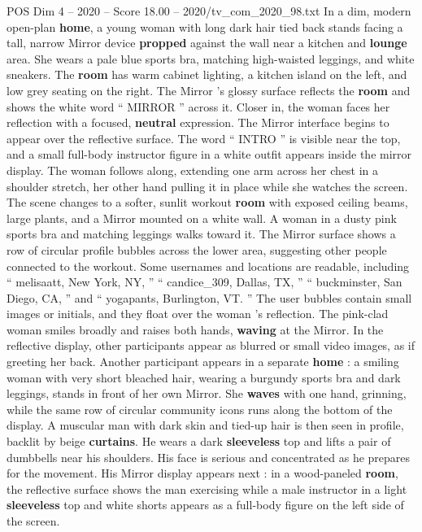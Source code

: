 \begin{textsample}{POS Dim 4 – 2020 – Score 18.00 – 2020/tv\_com\_2020\_98.txt}  \label{ex:f4_pos_008}
In a dim, modern open-plan \textbf{home}, a young woman with long dark hair tied back stands facing a tall, narrow Mirror device \textbf{propped} against the wall near a kitchen and \textbf{lounge} area.
She wears a pale blue sports bra, matching high-waisted leggings, and white sneakers.
The \textbf{room} has warm cabinet lighting, a kitchen island on the left, and low grey seating on the right.
The Mirror ’s glossy surface reflects the \textbf{room} and shows the white word “ MIRROR ” across it.
Closer in, the woman faces her reflection with a focused, \textbf{neutral} expression.
The Mirror interface begins to appear over the reflective surface.
The word “ INTRO ” is visible near the top, and a small full-body instructor figure in a white outfit appears inside the mirror display.
The woman follows along, extending one arm across her chest in a shoulder stretch, her other hand pulling it in place while she watches the screen.
The scene changes to a softer, sunlit workout \textbf{room} with exposed ceiling beams, large plants, and a Mirror mounted on a white wall.
A woman in a dusty pink sports bra and matching leggings walks toward it.
The Mirror surface shows a row of circular profile bubbles across the lower area, suggesting other people connected to the workout.
Some usernames and locations are readable, including “ melisaatt, New York, NY, ” “ candice\_309, Dallas, TX, ” “ buckminster, San Diego, CA, ” and “ yogapants, Burlington, VT. ” The user bubbles contain small images or initials, and they float over the woman ’s reflection.
The pink-clad woman smiles broadly and raises both hands, \textbf{waving} at the Mirror.
In the reflective display, other participants appear as blurred or small video images, as if greeting her back.
Another participant appears in a separate \textbf{home} : a smiling woman with very short bleached hair, wearing a burgundy sports bra and dark leggings, stands in front of her own Mirror.
She \textbf{waves} with one hand, grinning, while the same row of circular community icons runs along the bottom of the display.
A muscular man with dark skin and tied-up hair is then seen in profile, backlit by beige \textbf{curtains}.
He wears a dark \textbf{sleeveless} top and lifts a pair of dumbbells near his shoulders.
His face is serious and concentrated as he prepares for the movement.
His Mirror display appears next : in a wood-paneled \textbf{room}, the reflective surface shows the man exercising while a male instructor in a light \textbf{sleeveless} top and white shorts appears as a full-body figure on the left side of the screen.

\end{textsample}
